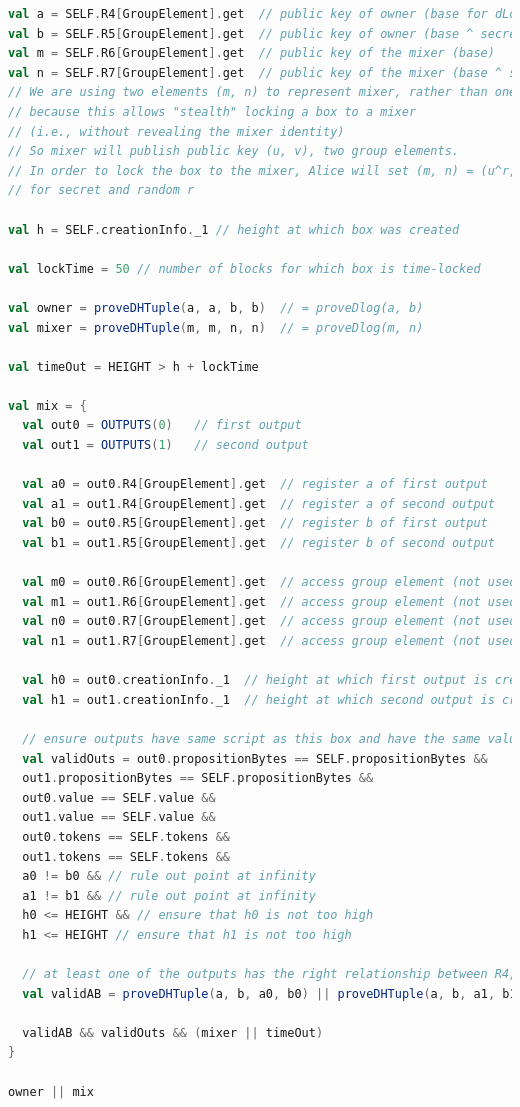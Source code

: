 \documentclass[runningheads]{llncs}
\begin{document}
\begin{lstlisting}[language=Scala,caption={Mix-script with Stealth Outsourceability},label=mixScript]
val a = SELF.R4[GroupElement].get  // public key of owner (base for dLog)
val b = SELF.R5[GroupElement].get  // public key of owner (base ^ secret)
val m = SELF.R6[GroupElement].get  // public key of the mixer (base)
val n = SELF.R7[GroupElement].get  // public key of the mixer (base ^ secret)
// We are using two elements (m, n) to represent mixer, rather than one
// because this allows "stealth" locking a box to a mixer
// (i.e., without revealing the mixer identity)
// So mixer will publish public key (u, v), two group elements.
// In order to lock the box to the mixer, Alice will set (m, n) = (u^r, v^r)
// for secret and random r

val h = SELF.creationInfo._1 // height at which box was created

val lockTime = 50 // number of blocks for which box is time-locked

val owner = proveDHTuple(a, a, b, b)  // = proveDlog(a, b)
val mixer = proveDHTuple(m, m, n, n)  // = proveDlog(m, n)

val timeOut = HEIGHT > h + lockTime

val mix = {
  val out0 = OUTPUTS(0)   // first output
  val out1 = OUTPUTS(1)   // second output

  val a0 = out0.R4[GroupElement].get  // register a of first output
  val a1 = out1.R4[GroupElement].get  // register a of second output
  val b0 = out0.R5[GroupElement].get  // register b of first output
  val b1 = out1.R5[GroupElement].get  // register b of second output

  val m0 = out0.R6[GroupElement].get  // access group element (not used)
  val m1 = out1.R6[GroupElement].get  // access group element (not used)
  val n0 = out0.R7[GroupElement].get  // access group element (not used)
  val n1 = out1.R7[GroupElement].get  // access group element (not used)

  val h0 = out0.creationInfo._1  // height at which first output is created
  val h1 = out1.creationInfo._1  // height at which second output is created

  // ensure outputs have same script as this box and have the same value
  val validOuts = out0.propositionBytes == SELF.propositionBytes &&
  out1.propositionBytes == SELF.propositionBytes &&
  out0.value == SELF.value &&
  out1.value == SELF.value &&
  out0.tokens == SELF.tokens &&
  out1.tokens == SELF.tokens &&
  a0 != b0 && // rule out point at infinity
  a1 != b1 && // rule out point at infinity
  h0 <= HEIGHT && // ensure that h0 is not too high
  h1 <= HEIGHT // ensure that h1 is not too high

  // at least one of the outputs has the right relationship between R4, R5
  val validAB = proveDHTuple(a, b, a0, b0) || proveDHTuple(a, b, a1, b1)

  validAB && validOuts && (mixer || timeOut)
}

owner || mix
\end{lstlisting}
\end{document}
